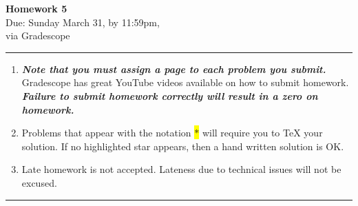 \documentclass[12pt]{article}
\newif\ifshow
\begin{document}
\begin{center}
\ifshow
  \textbf{\Large Homework 5 Solution}\\
\else
  \textbf{\Large Homework 5}\\
\fi
Due: Sunday March 31, by 11:59pm,\\via Gradescope\\
\end{center}

\hrule

\vspace{0.2cm}

\begin{enumerate}[$\bullet$]
\item  {\textbf{\textit{Note that you must assign a page to each problem you submit.}}}   Gradescope has great YouTube videos available on how to submit homework.  \textit{\textbf{Failure to submit homework correctly will result in a zero on homework.}}
\item Problems that appear with the notation \colorbox{yellow}{$\ast$} will require you to TeX your solution.  If no highlighted star appears, then a hand written solution is OK.  
\item Late homework is not accepted.  Lateness due to technical issues will not be excused.  
\end{enumerate}

\hrule

\vspace{0.5cm}
\end{document}
